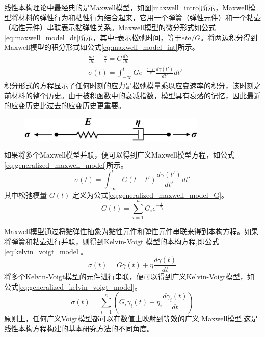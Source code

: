 线性本构理论中最经典的是Maxwell模型，如图\ref{maxwell_intro}所示，Maxwell模型将材料的弹性行为和粘性行为结合起来，它用一个弹簧（弹性元件）和一个粘壶（粘性元件）串联表示黏弹性关系。Maxwell模型的微分形式如公式\eqref{eq:maxwell_model_dt}所示，其中$\tau$表示松弛时间，等于$eta/G$。将两边积分得到Maxwell模型的积分形式如公式\eqref{eq:maxwell_model_int}所示。
\begin{align}
	 & \frac{d\sigma}{dt} + \frac{\sigma}{\tau}  = G \frac{d\gamma}{dt} \label{eq:maxwell_model_dt}                                                   \\
	 & \sigma(t)                                = \int_{-\infty}^{t} G e^{-\frac{t-t'}{\tau}} \frac{d\gamma(t')}{dt'} dt'\label{eq:maxwell_model_int}
\end{align}
积分形式的方程显示了任何时刻的应力是松弛模量乘以应变速率的积分，该时刻之前材料的整个历史。由于被积函数中的衰减指数，模型具有衰落的记忆，因此最近的应变历史比过去的应变历史更重要。
\begin{figure}[htbp]
	\centering
	\includegraphics[width=0.8\textwidth]{Fig/maxwell_intro.png}
\end{figure}
如果将多个Maxwell模型并联，便可以得到广义Maxwell模型方程，如公式\eqref{eq:generalized_maxwell_model}所示。
\begin{equation}
	\sigma(t) = \int_{-\infty}^{t} G(t-t') \frac{d\gamma(t')}{dt'} dt' \label{eq:generalized_maxwell_model}
\end{equation}
其中松弛模量 \(G(t)\) 定义为公式\eqref{eq:generalized_maxwell_model_G}。
\begin{equation}
	G(t) = \sum_{i=1}^{n} G_i e^{-\frac{t}{\tau_i}} \label{eq:generalized_maxwell_model_G}
\end{equation}

Maxwell模型通过将黏弹性抽象为黏性元件和弹性元件串联来得到本构方程。如果将弹簧和粘壶进行并联，则得到Kelvin-Voigt 模型的本构方程,即公式\eqref{eq:kelvin_voigt_model}。
\begin{equation}
	\sigma(t) = G \gamma(t) + \eta \frac{d\gamma(t)}{dt} \label{eq:kelvin_voigt_model}
\end{equation}
将多个Kelvin-Voigt模型的元件进行串联，便可以得到广义Kelvin-Voigt模型，如公式\eqref{eq:generalized_kelvin_voigt_model}。
\begin{equation}
	\sigma(t) = \sum_{i=1}^{n} \left( G_i \gamma_i(t) + \eta_i \frac{d\gamma_i(t)}{dt} \right)\label{eq:generalized_kelvin_voigt_model}
\end{equation}
原则上，任何广义Voigt模型都可以在数值上映射到等效的广义 Maxwell模型,这是线性本构方程构建的基本研究方法的不同角度。

